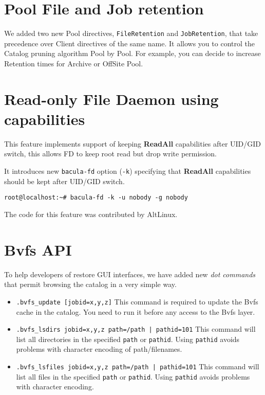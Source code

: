 \section{Pool File and Job retention}
\label{sec:poolfilejobretention}

We added two new Pool directives, \texttt{FileRetention} and
\texttt{JobRetention}, that take precedence over Client directives of the same
name. It allows you to control the Catalog pruning algorithm Pool by Pool. For
example, you can decide to increase Retention times for Archive or OffSite Pool.

\section{Read-only File Daemon using capabilities}
\label{sec:fdreadonly}
This feature implements support of keeping \textbf{ReadAll} capabilities after
UID/GID switch, this allows FD to keep root read but drop write permission.

It introduces new \texttt{bacula-fd} option (\texttt{-k}) specifying that
\textbf{ReadAll} capabilities should be kept after UID/GID switch.

\begin{verbatim}
root@localhost:~# bacula-fd -k -u nobody -g nobody
\end{verbatim}

The code for this feature was contributed by AltLinux.

\section{Bvfs API}
\label{sec:bvfs}

To help developers of restore GUI interfaces, we have added new \textsl{dot
  commands} that permit browsing the catalog in a very simple way.

\begin{itemize}
\item \texttt{.bvfs\_update [jobid=x,y,z]} This command is required to update
  the Bvfs cache in the catalog. You need to run it before any access to the
  Bvfs layer.

\item \texttt{.bvfs\_lsdirs jobid=x,y,z path=/path | pathid=101} This command
  will list all directories in the specified \texttt{path} or
  \texttt{pathid}. Using \texttt{pathid} avoids problems with character
  encoding of path/filenames.

\item \texttt{.bvfs\_lsfiles jobid=x,y,z path=/path | pathid=101} This command
  will list all files in the specified \texttt{path} or \texttt{pathid}. Using
  \texttt{pathid} avoids problems with character encoding.
\end{itemize}

